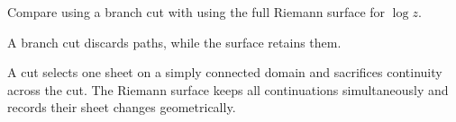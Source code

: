 \begin{exercise}\label{exr:iv22-expand-16}
Compare using a branch cut with using the full Riemann surface for \(\log z\).
\end{exercise}
\begin{hint}
A branch cut discards paths, while the surface retains them.
\end{hint}
\begin{solution}
A cut selects one sheet on a simply connected domain and sacrifices continuity across the cut. The Riemann surface keeps all continuations simultaneously and records their sheet changes geometrically.
\end{solution}


